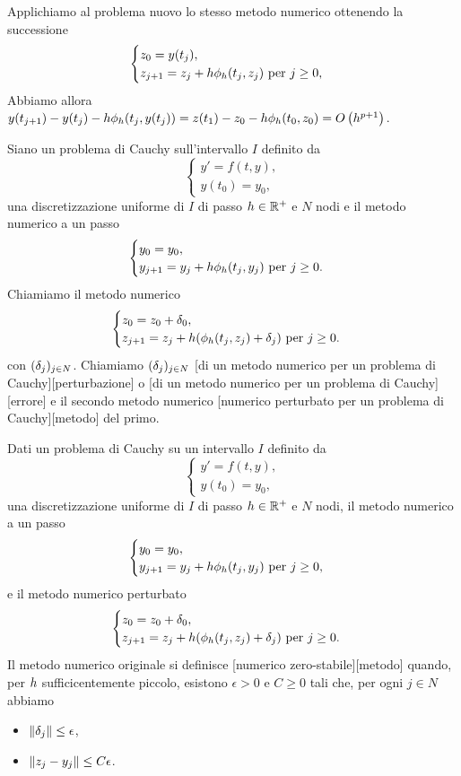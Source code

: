 Applichiamo al problema nuovo lo stesso metodo numerico ottenendo la successione
\[
\begin{cases}
	z_0 = y(t_j),\\
	z_{j + 1} = z_j + h\phi_h(t_j,z_j)\text{ per }j \geq 0,
\end{cases}
\]
Abbiamo allora $y(t_{j + 1}) - y(t_j) - h \phi_h(t_j,y(t_j)) = z(t_1) - z_0 - h \phi_h(t_0,z_0) = O \left ( h^{p + 1} \right )$. \EndProof
\begin{Definition}
	Siano un problema di Cauchy sull'intervallo $I$ definito da
	\[
	\begin{cases}
		y' = f(t,y),\\
		y(t_0) = y_0,
	\end{cases}
	\]
	una discretizzazione uniforme di $I$ di passo $h \in \mathbb{R}^+$ e $N$ nodi e il metodo numerico a un passo
	\[
	\begin{cases}
		y_0 = y_0,\\
		y_{j + 1} = y_j + h\phi_h(t_j,y_j)\text{ per }j \geq 0.
	\end{cases}
	\]
	Chiamiamo il metodo numerico
	\[
	\begin{cases}
		z_0 = z_0 + \delta_0,\\
		z_{j + 1} = z_j + h(\phi_h(t_j,z_j) + \delta_j)\text{ per }j \geq 0.
	\end{cases}
	\]
	con $(\Perturbation_j)_{j \in N}$. Chiamiamo $(\Perturbation_j)_{j \in N}$ [di un metodo numerico per un problema di Cauchy][perturbazione] o [di un metodo numerico per un problema di Cauchy][errore] e il secondo metodo numerico [numerico perturbato per un problema di Cauchy][metodo] del primo.
\end{Definition}
\begin{Definition}
	Dati un problema di Cauchy su un intervallo $I$ definito da
	\[
	\begin{cases}
		y' = f(t,y),\\
		y(t_0) = y_0,
	\end{cases}
	\]
	una discretizzazione uniforme di $I$ di passo $h \in \mathbb{R}^+$ e $N$ nodi, il metodo numerico a un passo
	\[
	\begin{cases}
		y_0 = y_0,\\
		y_{j + 1} = y_j + h\phi_h(t_j,y_j)\text{ per }j \geq 0,
	\end{cases}
	\]
	e il metodo numerico perturbato
	\[
	\begin{cases}
		z_0 = z_0 + \delta_0,\\
		z_{j + 1} = z_j + h(\phi_h(t_j,z_j) + \delta_j)\text{ per }j \geq 0.
	\end{cases}
	\]
	Il metodo numerico originale si definisce [numerico zero-stabile][metodo] quando, per $h$ sufficicentemente piccolo, esistono $\epsilon > 0$ e $C \geq 0$ tali che, per ogni $j \in N$ abbiamo
	\begin{itemize}
		\item $\Norm{\Perturbation_j} \leq \epsilon$,
		\item $\Norm{z_j - y_j} \leq C \epsilon$.
	\end{itemize}
\end{Definition}
